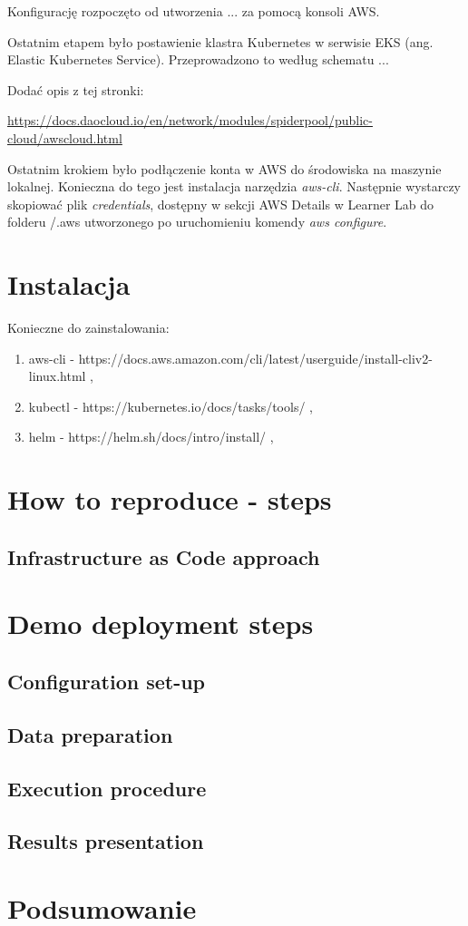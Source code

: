\documentclass[onecolumn,12pt]{article}
\begin{document}
Konfigurację rozpoczęto od utworzenia  ...  za pomocą konsoli AWS. 

Ostatnim etapem było postawienie klastra Kubernetes w serwisie EKS (ang. Elastic Kubernetes Service). 
Przeprowadzono to według schematu ... 
 

Dodać opis z tej stronki:

\url{https://docs.daocloud.io/en/network/modules/spiderpool/public-cloud/awscloud.html}

Ostatnim krokiem było podłączenie konta w AWS do środowiska na maszynie lokalnej. Konieczna do tego jest 
instalacja narzędzia \textit{aws-cli}. Następnie wystarczy skopiować plik \textit{credentials}, dostępny w  sekcji AWS Details w Learner Lab do folderu /.aws utworzonego po uruchomieniu komendy \textit{aws configure}.


\section{Instalacja}

Konieczne do zainstalowania:

\begin{enumerate}
    \item aws-cli - https://docs.aws.amazon.com/cli/latest/userguide/install-cliv2-linux.html ,
    \item kubectl - https://kubernetes.io/docs/tasks/tools/ ,
    \item helm -  https://helm.sh/docs/intro/install/ ,
\end{enumerate}


\section{How to reproduce - steps}

\subsection{Infrastructure as Code approach}

\section{Demo deployment steps}

\subsection{Configuration set-up}
\subsection{Data preparation}
\subsection{Execution procedure}
\subsection{Results presentation}

\section{Podsumowanie}

%
\end{document}
